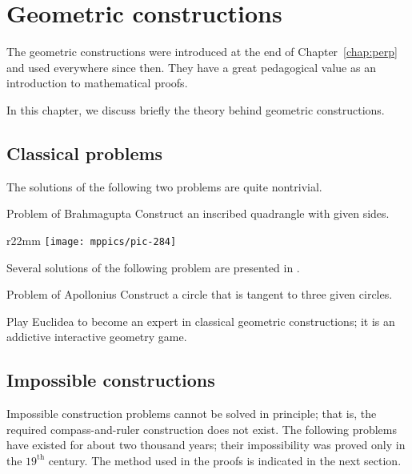 \chapter{Geometric constructions}
\label{chap:car}


The geometric constructions were introduced at the end of Chapter~\ref{chap:perp} and used everywhere since then.
They have a great pedagogical value as an introduction to mathematical proofs.

In this chapter, we discuss briefly the theory behind geometric constructions.


%
%

\section{Classical problems}

The solutions of the following two problems are quite nontrivial.

\begin{thm}{Problem of Brahmagupta} 
Construct an inscribed quadrangle with given sides.
\end{thm}

{

\begin{wrapfigure}[7]{r}{22mm}
\vskip-10mm
\centering
\texttt{[image: mppics/pic-284]}
\end{wrapfigure}

Several solutions of the following problem are presented in \cite{hadamard}.
 
\begin{thm}{Problem of Apollonius} Construct a circle that is tangent to three given circles.
\end{thm}

Play Euclidea \cite{euclidea} to become an expert in classical geometric constructions;
it is an addictive interactive geometry game.

}

\section{Impossible constructions}

Impossible construction problems cannot be solved in principle; 
that is, the required compass-and-ruler construction does not exist.
The following problems have existed for about two thousand years;
their impossibility was proved only in the $19^\text{th}$ century.
The method used in the proofs is indicated in the next section.


